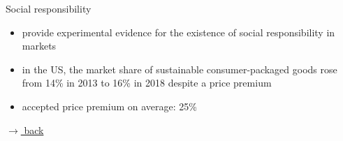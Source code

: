 \documentclass[11pt,aspectratio=169]{beamer}
\newcommand{\ar}{$\Rightarrow$ \ }
\begin{document}
	\begin{frame}{Social responsibility}
		\hypertarget{rise1}{}
		\begin{itemize}
			\vspace{4mm}
			\item<1->  \cite{Bartling2015DoResponsibility} provide experimental evidence for the existence of social responsibility in markets 
			\vspace{2mm}
			\item<1-> in the US, the market share of sustainable consumer-packaged goods rose from 14\% in 2013 to 16\% in 2018 despite a price premium \citep{Kronthal-Sacco2020SustainableMessages}%
			\vspace{2mm} 
			\item<1-> accepted price premium on average: 25\% %
			\citep{SK2021}
		\end{itemize} %
		\hfill
		\hyperlink{backmov}{\tiny{$\rightarrow$ back}}
	\end{frame}
\end{document}
